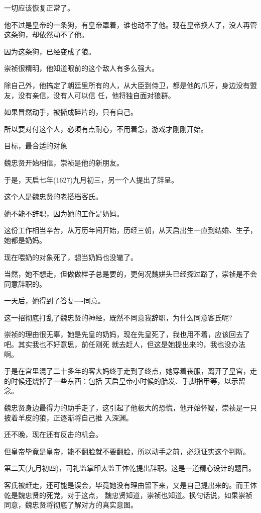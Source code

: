 \documentclass[11pt,a4paper,onecolumn]{article}
\begin{document}
一切应该恢复正常了。

他不过是皇帝的一条狗，有皇帝罩着，谁也动不了他。现在皇帝换人了，没人再管这条狗，却依然动不了他。

因为这条狗，已经变成了狼。

崇祯很精明，他知道眼前的这个敌人有多么强大。

除自己外，他搞定了朝廷里所有的人，从大臣到侍卫，都是他的爪牙，身边没有盟友，没有亲信，没有人可以信
任，他将独自面对狼群。

如果冒然动手，被撕成碎片的，只有自己。

所以要对付这个人，必须有点耐心，不用着急，游戏才刚刚开始。

目标，最合适的对象

魏忠贤开始相信，崇祯是他的新朋友。

于是，天启七年(1627)九月初三，另一个人提出了辞呈。

这个人是魏忠贤的老搭档客氏。

她不能不辞职，因为她的工作是奶妈。

这份工作相当辛苦，从万历年间开始，历经三朝，从天启出生一直到结婚、生子，她都是奶妈。

现在喂奶的对象死了，想当奶妈也没辙了。

当然，她不想走，但做做样子总是要的，更何况魏姘头已经探过路了，崇祯是不会同意辞职的。

一天后，她得到了答复----同意。

这一招彻底打乱了魏忠贤的神经，既然不同意我辞职，为什么同意客氏呢?

崇祯的理由很无辜，她是先皇的奶妈，现在先皇死了，我也用不着，应该回去了吧。其实我也不好意思，前任刚死
就去赶人，但这是她提出来的，我也没办法啊。

于是在宫里混了二十多年的客大妈终于走到了终点，她穿着丧服，离开了皇宫，走的时候还烧掉了一些东西：包括
天启皇帝小时候的胎发、手脚指甲等，以示留念。

魏忠贤身边最得力的助手走了，这引起了他极大的恐慌，他开始怀疑，崇祯是一只披着羊皮的狼，正逐渐将自己推
入深渊。

还不晚，现在还有反击的机会。

但皇帝毕竟是皇帝，能不翻脸就不要翻脸，所以动手之前，必须证实这个判断。

第二天(九月初四)，司礼监掌印太监王体乾提出辞职。这是一道精心设计的题目。

客氏被赶走，还可能是误会，毕竟她没有理由留下来，又是自己提出来的。而王体乾是魏忠贤的死党，对于这点，
魏忠贤知道，崇祯也知道。换句话说，如果崇祯同意，魏忠贤将彻底了解对方的真实意图。
\end{document}
